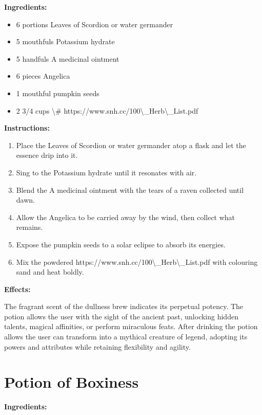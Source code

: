 \documentclass{article}
\begin{document}
\textbf{Ingredients:}

\begin{itemize}
  \item 6 portions Leaves of Scordion or water germander
  \item 5 mouthfuls Potassium hydrate
  \item 5 handfuls A medicinal ointment
  \item 6 pieces Angelica
  \item 1 mouthful pumpkin seeds
  \item 2 3/4 cups \textbackslash{}# https://www.snh.cc/100\textbackslash{}_Herb\textbackslash{}_List.pdf
\end{itemize}

\textbf{Instructions:}

\begin{enumerate}
  \item Place the Leaves of Scordion or water germander atop a flask and let the essence drip into it.
  \item Sing to the Potassium hydrate until it resonates with air.
  \item Blend the A medicinal ointment with the tears of a raven collected until dawn.
  \item Allow the Angelica to be carried away by the wind, then collect what remains.
  \item Expose the pumpkin seeds to a solar eclipse to absorb its energies.
  \item Mix the powdered  https://www.snh.cc/100\textbackslash{}_Herb\textbackslash{}_List.pdf with colouring sand and heat boldly.
\end{enumerate}

\textbf{Effects:}

The fragrant scent of the dullness brew indicates its perpetual potency. The potion allows the user with the sight of the ancient past, unlocking hidden talents, magical affinities, or perform miraculous feats. After drinking the potion allows the user can transform into a mythical creature of legend, adopting its powers and attributes while retaining flexibility and agility.

\newpage
\section*{Potion of Boxiness}

\textbf{Ingredients:}
\end{document}

